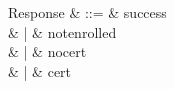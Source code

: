\documentclass[12pt,letterpaper]{article}
\begin{document}
    \begin{syntax}
        [Student]
        \also
        Response & ::= & success \\
        & | & notenrolled \\
        & | & nocert \\
        & | & cert
    \end{syntax}
\end{document}
